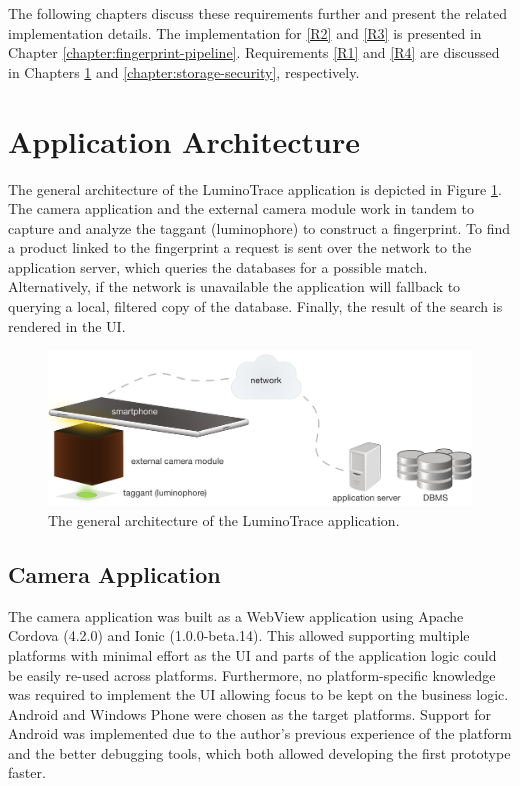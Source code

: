 \documentclass[thesis.tex]{subfiles}
\begin{document}
\noindent The following chapters discuss these requirements further and present the related implementation details. The implementation for \ref{R2} and \ref{R3} is presented in Chapter \ref{chapter:fingerprint-pipeline}. Requirements \ref{R1} and \ref{R4} are discussed in Chapters \ref{chapter:application-architecture} and \ref{chapter:storage-security}, respectively.

\section{Application Architecture}
\label{chapter:application-architecture}

The general architecture of the LuminoTrace application is depicted in Figure \ref{figure:architecture}. The camera application and the external camera module work in tandem to capture and analyze the taggant (luminophore) to construct a fingerprint. To find a product linked to the fingerprint a request is sent over the network to the application server, which queries the databases for a possible match. Alternatively, if the network is unavailable the application will fallback to querying a local, filtered copy of the database. Finally, the result of the search is rendered in the UI.

\begin{figure}[h]
\centering \includegraphics[width=13.5cm]{images/design_implementation/architecture.pdf}
\caption{The general architecture of the LuminoTrace application. \label{figure:architecture}}
\end{figure}

\subsection{Camera Application}
\label{chapter:camera-application}

The camera application was built as a WebView application using Apache Cordova (4.2.0) and Ionic (1.0.0-beta.14). This allowed supporting multiple platforms with minimal effort as the UI and parts of the application logic could be easily re-used across platforms. Furthermore, no platform-specific knowledge was required to implement the UI allowing focus to be kept on the business logic. Android and Windows Phone were chosen as the target platforms. Support for Android was implemented due to the author's previous experience of the platform and the better debugging tools, which both allowed developing the first prototype faster.
\end{document}
